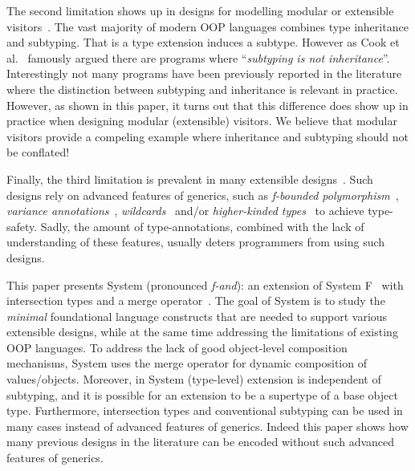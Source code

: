   The second limitation shows up in designs for modelling
  modular or extensible visitors~\cite{togersen:2004,oliveira09modular}.  The vast majority of modern
  OOP languages combines type inheritance and subtyping. 
  That is a type extension induces a subtype. However
  as Cook et al.~\cite{cook1989inheritance} famously argued there are programs where
  ``\emph{subtyping is not inheritance}''. Interestingly 
  not many programs have been previously reported in the literature
  where the distinction between subtyping and inheritance is
  relevant in practice. However, as shown in this paper, it turns out that this
  difference does show up in practice when designing modular
  (extensible) visitors.  We believe that modular visitors provide a
  compeling example where inheritance and subtyping should
  not be conflated!

  Finally, the third limitation is prevalent in many extensible
  designs~\cite{togersen:2004,Zenger-Odersky2005,oliveira09modular,oliveira2013feature,rendel14attributes}.
  Such designs rely on advanced features of generics,
  such as \emph{f-bounded polymorphism}~\cite{Canning89f-bounded}, \emph{variance
    annotations}~\cite{Igarashi06variant}, \emph{wildcards}~\cite{Torgersen04wildcards} and/or \emph{higher-kinded
    types}~\cite{Moors08generics} to achieve type-safety. Sadly, the amount of
  type-annotations, combined with the lack of understanding of these
  features, usually deters programmers from using such designs.

\begin{comment}
Motivated by the insights gained in previous work, this paper presents 
a minimal core calculus that addresses current limitations and
provides a better foundational model for statically typed
delegation-based OOP? We show that Object Algebras fit nicely in this
model. 
\end{comment}

This paper presents System \name (pronounced \emph{f-and}): an extension of System F~\cite{Reynolds74f}
with intersection types and a merge operator~\cite{dunfield2014elaborating}.  The goal of
System \name is to study the \emph{minimal} foundational language
constructs that are needed to support various extensible designs,
while at the same time addressing the limitations of existing OOP
languages. To address the lack of good object-level composition
mechanisms, System \name uses the merge operator for dynamic
composition of values/objects. Moreover, in System \name (type-level)
extension is independent of subtyping, and it is possible for an
extension to be a supertype of a base object type. Furthermore,
intersection types and conventional subtyping can be used in many
cases instead of advanced features of generics. Indeed this paper 
shows how many previous designs in the literature can be encoded 
without such advanced features of generics.


